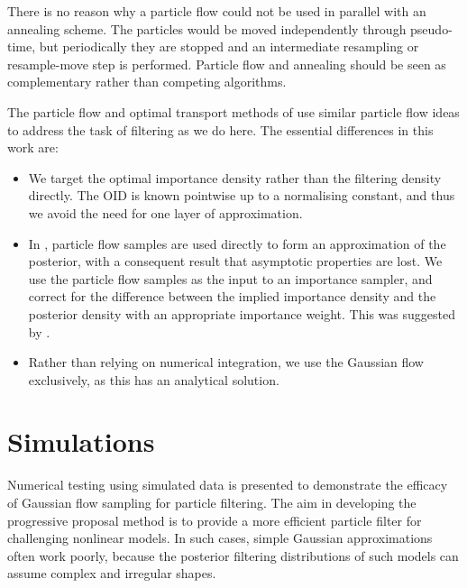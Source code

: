 \documentclass{article}
\begin{document}
There is no reason why a particle flow could not be used in parallel with an annealing scheme. The particles would be moved independently through pseudo-time, but periodically they are stopped and an intermediate resampling or resample-move step is performed. Particle flow and annealing should be seen as complementary rather than competing algorithms.

The particle flow and optimal transport methods of \citep{Daum2008,Daum2011d,Reich2011,Reich2012} use similar particle flow ideas to address the task of filtering as we do here. The essential differences in this work are:
%
\begin{itemize}
  \item We target the optimal importance density rather than the filtering density directly. The OID is known pointwise up to a normalising constant, and thus we avoid the need for one layer of approximation.
  \item In \citep{Daum2008,Daum2011d,Reich2011,Reich2012}, particle flow samples are used directly to form an approximation of the posterior, with a consequent result that asymptotic properties are lost. We use the particle flow samples as the input to an importance sampler, and correct for the difference between the implied importance density and the posterior density with an appropriate importance weight. This was suggested by \cite{Reich2012a}.
  \item Rather than relying on numerical integration, we use the Gaussian flow exclusively, as this has an analytical solution.
\end{itemize}



\section{Simulations}

Numerical testing using simulated data is presented to demonstrate the efficacy of Gaussian flow sampling for particle filtering. The aim in developing the progressive proposal method is to provide a more efficient particle filter for challenging nonlinear models. In such cases, simple Gaussian approximations often work poorly, because the posterior filtering distributions of such models can assume complex and irregular shapes.
\end{document}
